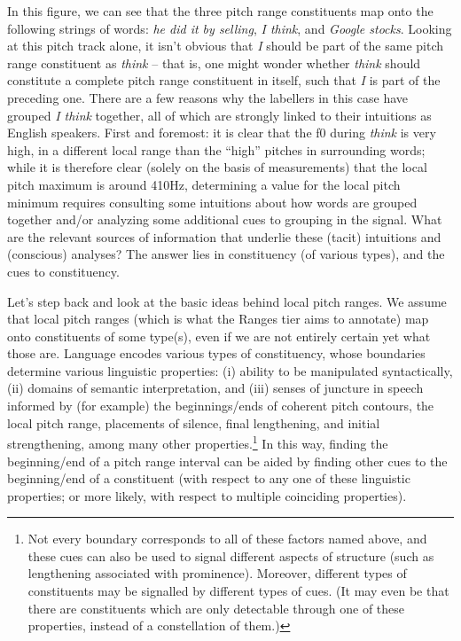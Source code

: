 \documentclass[11pt, twoside]{memoir}
\def\langtext#1{\textit{#1}}
\begin{document}
In this figure, we can see that the three pitch range constituents map onto the following strings of words: \langtext{he did it by selling}, \langtext{I think}, and \langtext{Google stocks}. Looking at this pitch track alone, it isn’t obvious that \langtext{I} should be part of the same pitch range constituent as \langtext{think} – that is, one might wonder whether \langtext{think} should constitute a complete pitch range constituent in itself, such that \langtext{I} is part of the preceding one. There are a few reasons why the labellers in this case have grouped \langtext{I think} together, all of which are strongly linked to their intuitions as English speakers. First and foremost: it is clear that the f0 during \langtext{think} is very high, in a different local range than the “high” pitches in surrounding words; while it is therefore clear (solely on the basis of measurements) that the local pitch maximum is around 410Hz, determining a value for the local pitch minimum requires consulting some intuitions about how words are grouped together and/or analyzing some additional cues to grouping in the signal. What are the relevant sources of information that underlie these (tacit) intuitions and (conscious) analyses? The answer lies in constituency (of various types), and the cues to constituency.

Let’s step back and look at the basic ideas behind local pitch ranges. We assume that local pitch ranges (which is what the Ranges tier aims to annotate) map onto constituents of some type(s), even if we are not entirely certain yet what those are. Language encodes various types of constituency, whose boundaries determine various linguistic properties: (i) ability to be manipulated syntactically, (ii) domains of semantic interpretation, and (iii) senses of juncture in speech informed by (for example) the beginnings\slash ends of coherent pitch contours, the local pitch range, placements of silence, final lengthening, and initial strengthening, among many other properties.\footnote{Not every boundary corresponds to all of these factors named above, and these cues can also be used to signal different aspects of structure (such as lengthening associated with prominence). Moreover, different types of constituents may be signalled by different types of cues. (It may even be that there are constituents which are only detectable through one of these properties, instead of a constellation of them.)} In this way, finding the beginning\slash end of a pitch range interval can be aided by finding other cues to the beginning\slash end of a constituent (with respect to any one of these linguistic properties; or more likely, with respect to multiple coinciding properties).
\end{document}
